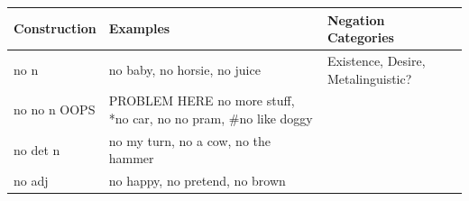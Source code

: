 \documentclass[man]{apa6}
\begin{document}
\begin{longtable}[]{@{}lll@{}}
\toprule
\begin{minipage}[b]{0.21\columnwidth}\raggedright\strut
Construction\strut
\end{minipage} & \begin{minipage}[b]{0.43\columnwidth}\raggedright\strut
Examples\strut
\end{minipage} & \begin{minipage}[b]{0.27\columnwidth}\raggedright\strut
Negation Categories\strut
\end{minipage}\tabularnewline
\midrule
\endhead
\begin{minipage}[t]{0.21\columnwidth}\raggedright\strut
no n\strut
\end{minipage} & \begin{minipage}[t]{0.43\columnwidth}\raggedright\strut
no baby, no horsie, no juice\strut
\end{minipage} & \begin{minipage}[t]{0.27\columnwidth}\raggedright\strut
Existence, Desire, Metalinguistic?\strut
\end{minipage}\tabularnewline
\begin{minipage}[t]{0.21\columnwidth}\raggedright\strut
no no n OOPS\strut
\end{minipage} & \begin{minipage}[t]{0.43\columnwidth}\raggedright\strut
PROBLEM HERE no more stuff, *no car, no no pram, \#no like doggy\strut
\end{minipage} & \begin{minipage}[t]{0.27\columnwidth}\raggedright\strut
\strut
\end{minipage}\tabularnewline
\begin{minipage}[t]{0.21\columnwidth}\raggedright\strut
no det n\strut
\end{minipage} & \begin{minipage}[t]{0.43\columnwidth}\raggedright\strut
no my turn, no a cow, no the hammer\strut
\end{minipage} & \begin{minipage}[t]{0.27\columnwidth}\raggedright\strut
\strut
\end{minipage}\tabularnewline
\begin{minipage}[t]{0.21\columnwidth}\raggedright\strut
no adj\strut
\end{minipage} & \begin{minipage}[t]{0.43\columnwidth}\raggedright\strut
no happy, no pretend, no brown\strut
\end{minipage} & \begin{minipage}[t]{0.27\columnwidth}\raggedright\strut

\end{minipage}
\end{longtable}
\end{document}
